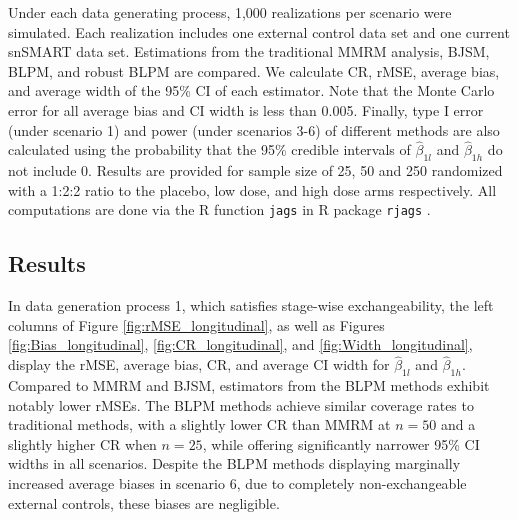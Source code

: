 Under each data generating process, 1,000 realizations per scenario were simulated. Each realization includes one external control data set and one current \ac{snSMART} data set. Estimations from the traditional \ac{MMRM} analysis, \ac{BJSM}, \ac{BLPM}, and robust \ac{BLPM} are compared. We calculate \ac{CR}, \ac{rMSE}, average bias, and average width of the 95\% \ac{CI} of each estimator. Note that the Monte Carlo error for all average bias and \ac{CI} width is less than 0.005. Finally, type I error (under scenario 1) and power (under scenarios 3-6) of different methods are also calculated using the probability that the 95\% credible intervals of $\hat{\beta}_{1l}$ and $\hat{\beta}_{1h}$ do not include 0. Results are provided for sample size of 25, 50 and 250 randomized with a 1:2:2 ratio to the placebo, low dose, and high dose arms respectively. All computations are done via the R function \texttt{jags} in R package \texttt{rjags} \citep{rjags}.

\subsection{Results}
In data generation process 1, which satisfies stage-wise exchangeability, the left columns of Figure \ref{fig:rMSE_longitudinal}, as well as Figures \ref{fig:Bias_longitudinal}, \ref{fig:CR_longitudinal}, and \ref{fig:Width_longitudinal}, display the \ac{rMSE}, average bias, \ac{CR}, and average \ac{CI} width for $\hat{\beta}_{1l}$ and $\hat{\beta}_{1h}$. Compared to \ac{MMRM} and \ac{BJSM}, estimators from the \ac{BLPM} methods exhibit notably lower rMSEs. The \ac{BLPM} methods achieve similar coverage rates to traditional methods, with a slightly lower \ac{CR} than \ac{MMRM} at $n = 50$ and a slightly higher \ac{CR} when $n = 25$, while offering significantly narrower 95\% \ac{CI} widths in all scenarios. Despite the \ac{BLPM} methods displaying marginally increased average biases in scenario 6, due to completely non-exchangeable external controls, these biases are negligible.

